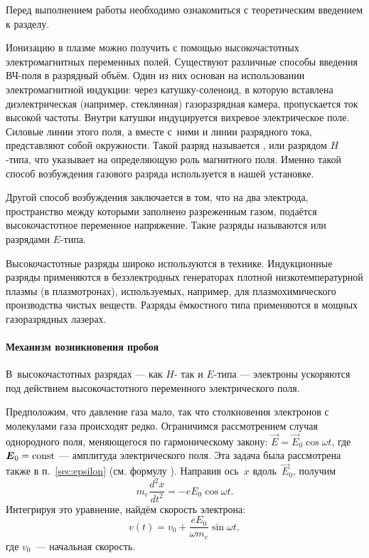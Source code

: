 


Перед выполнением работы необходимо ознакомиться с
теоретическим введением к разделу.

Ионизацию в плазме можно получить с помощью высокочастотных электромагнитных
переменных полей. Существуют различные способы введения ВЧ-поля
в разрядный объём. Один из них основан на использовании электромагнитной
индукции: через катушку-соленоид, в которую вставлена диэлектрическая
(например, стеклянная) газоразрядная камера, пропускается ток высокой частоты.
Внутри катушки индуцируется вихревое электрическое поле.
Силовые линии этого поля, а вместе с~ними и линии разрядного тока,
представляют собой окружности. Такой разряд  называется ,
 или разрядом $H$-типа, что указывает
на определяющую роль магнитного поля. 
Именно такой способ возбуждения газового разряда используется в нашей установке.

Другой способ возбуждения заключается в том, что на два электрода,
пространство между которыми заполнено разреженным газом,
подаётся высокочастотное переменное напряжение. 
Такие разряды называются  или
разрядами $E$-типа.

Высокочастотные разряды широко используются в технике. Индукционные разряды
применяются в безэлектродных генераторах плотной низкотемпературной плазмы
(в плазмотронах), используемых, например, для плазмохимического производства
чистых веществ. Разряды ёмкостного типа применяются в мощных 
газоразрядных лазерах.

\paragraph{Механизм возникновения пробоя} 
В~высокочастотных разрядах --- как $H$- так и $E$-типа --- электроны
ускоряются под действием высокочастотного переменного электрического поля.

Предположим, что давление газа мало, так что столкновения электронов
с молекулами газа происходят редко. 
Ограничимся рассмотрением случая однородного поля, 
меняющегося по гармоническому закону: $\vec{E}=\vec{E}_0 \cos \omega t$, 
где ${\boldsymbol{E}}_0=\mathrm{const}$ --- амплитуда электрического поля. 
Эта задача была рассмотрена также в п.~\ref{sec:epsilon} (см. формулу ).
Направив ось~$x$ вдоль~$\vec{E}_0$, получим
\[
    m_e\frac{d^2x}{dt^2}=-eE_0\cos\omega t.
\]
Интегрируя это уравнение, найдём скорость электрона:
\begin{equation*}
    v(t)=v_0+\frac{eE_0}{\omega m_e}\sin\omega t,
\end{equation*}
где $v_0$~--- начальная скорость.

